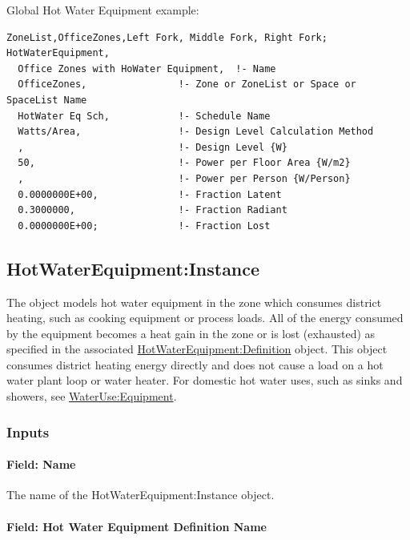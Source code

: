 Global Hot Water Equipment example:

\begin{lstlisting}
ZoneList,OfficeZones,Left Fork, Middle Fork, Right Fork;
HotWaterEquipment,
  Office Zones with HoWater Equipment,  !- Name
  OfficeZones,                !- Zone or ZoneList or Space or SpaceList Name
  HotWater Eq Sch,            !- Schedule Name
  Watts/Area,                 !- Design Level Calculation Method
  ,                           !- Design Level {W}
  50,                         !- Power per Floor Area {W/m2}
  ,                           !- Power per Person {W/Person}
  0.0000000E+00,              !- Fraction Latent
  0.3000000,                  !- Fraction Radiant
  0.0000000E+00;              !- Fraction Lost
\end{lstlisting}


\subsection{HotWaterEquipment:Instance}\label{hotwaterequipmentinstance}

The object models hot water equipment in the zone which consumes district heating, such as cooking equipment or process loads. All of the energy consumed by the equipment becomes a heat gain in the zone or is lost (exhausted) as specified in the associated \hyperref[hotwaterequipmentdefinition]{HotWaterEquipment:Definition} object. This object consumes district heating energy directly and does not cause a load on a hot water plant loop or water heater. For domestic hot water uses, such as sinks and showers, see \hyperref[wateruseequipment]{WaterUse:Equipment}.

\subsubsection{Inputs}\label{inputs-5-015-hw-instance}

\paragraph{Field: Name}\label{field-name-5-011-hw-instance}

The name of the HotWaterEquipment:Instance object.

\paragraph{Field: Hot Water Equipment Definition Name}\label{field-hot-water-equipment-definition-name}


